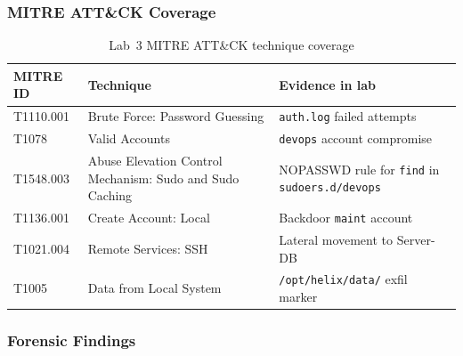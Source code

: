 \subsubsection*{MITRE ATT\&CK Coverage}

\begin{table}[H]
\centering
\small
\begin{tabularx}{\textwidth}{lXX}
\toprule
\textbf{MITRE ID} & \textbf{Technique} & \textbf{Evidence in lab} \\
\midrule
T1110.001 & Brute Force: Password Guessing & \texttt{auth.log} failed attempts \\
T1078     & Valid Accounts                 & \texttt{devops} account compromise \\
T1548.003 & Abuse Elevation Control Mechanism: Sudo and Sudo Caching          & NOPASSWD rule for \texttt{find} in \texttt{sudoers.d/devops} \\
T1136.001 & Create Account: Local          & Backdoor \texttt{maint} account \\
T1021.004 & Remote Services: SSH           & Lateral movement to Server-DB \\
T1005     & Data from Local System         & \texttt{/opt/helix/data/} exfil marker \\
\bottomrule
\end{tabularx}
\caption{Lab~3 MITRE ATT\&CK technique coverage}
\label{tab:lab3-mitre}
\end{table}


\subsubsection*{Forensic Findings}

